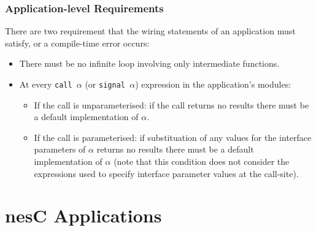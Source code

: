 \documentclass[11pt]{article}
\newcommand{\code}[1]{{\tt #1}}
\newcommand{\nesc}{nesC\xspace}
\begin{document}
\subsubsection{Application-level Requirements}
\label{sec:wiring-reqs}

There are two requirement that the wiring statements of an application must
satisfy, or a compile-time error occurs:
\begin{itemize}
\item There must be no infinite loop involving only intermediate functions.
\item At every \code{call $\alpha$} (or \code{signal $\alpha$}) expression
in the application's modules:
\begin{itemize}
\item If the call is unparameterised: if the call returns no results there
must be a default implementation of $\alpha$.
\item If the call is parameterised: if substituation of any values for the
interface parameters of $\alpha$ returns no results there must be a default
implementation of $\alpha$ (note that this condition does not consider the
expressions used to specify interface parameter values at the call-site).
\end{itemize}
\end{itemize}

\section{\nesc Applications}
\label{sec:app}
\end{document}
